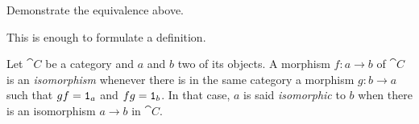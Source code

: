 \begin{exercise}
Demonstrate the equivalence above.
\end{exercise}

This is enough to formulate a definition.

\begin{definition}
Let \(\cat C\) be a category and \(a\) and \(b\) two of its objects. A morphism \(f : a \to b\) of \(\cat C\) is an {\em isomorphism} whenever there is in the same category a morphism \(g : b \to a\) such that \(gf = \mathtt 1_a\) and \(fg = \mathtt 1_b\).
In that case, \(a\) is said {\em isomorphic} to \(b\) when there is an isomorphism \(a \to b\) in \(\cat C\).
\end{definition}

\begin{definition}
\NotaInterna{\dots{}}
\end{definition}

\begin{example}
\end{example}

\begin{definition}[Skeleton]
\NotaInterna{\dots{}}
\end{definition}